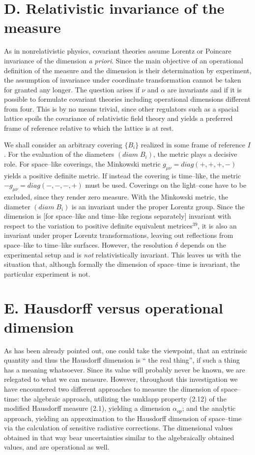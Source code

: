 \section{D. Relativistic invariance of the measure}
As in nonrelativistic physics, covariant theories
assume Lorentz or Poincare invariance of the dimension
{\it a priori}.
Since the main objective of an operational definition
of the measure and the dimension is their determination
by experiment, the assumption of invariance under
coordinate transformation cannot be taken for granted any
longer.
The question arises if $\nu $ and $\alpha $ are invariants
and if it is possible to formulate covariant theories including
operational dimensions different from four.
This is by no means trivial, since other regulators
such as a spacial lattice spoils the covariance of relativistic
field theory and yields a preferred frame of reference
relative to which the lattice is at rest.



We shall consider an arbitrary covering $\lbrace B_i\rbrace $
realized in some frame of reference $I$.
For the evaluation of the diameters $(diam\;B_i)$,
the metric plays a decisive role.
For space--like coverings, the Minkowski metric
$g_{\mu \nu }=diag(+,+,+,-)$ yields a positive definite
metric.
If instead the covering is time--like, the
metric $-g_{\mu \nu }=diag(-,-,-,+)$ must be used.
Coverings on the light--cone have to be excluded, since they
render zero measure.
With the Minkowski metric, the diameter $(diam\; B_i)$
is an invariant under the proper Lorentz group.
Since the dimension is [for space--like and time--like
regions separately] invariant with respect to
the variation to positive definite equivalent metrices$^{39}$,
it is also an invariant under proper Lorentz transformations,
leaving out reflections from space--like to time--like surfaces.
However, the  resolution $\delta $ depends on the experimental
setup and is {\it not} relativistically invariant.
This leaves us with the situation that, although formally
the dimension of space--time is invariant, the particular
experiment is not.
\endsection
\section{E. Hausdorff versus operational dimension}
As has been already pointed out, one could take the viewpoint, that an extrinsic
quantity and thus the Hausdorff dimension is ``
the real thing'', if such a thing has a meaning whatsoever.
Since its value will probably never be known, we are relegated
to what we can measure.
However, throughout this investigation we have
encountered two different approaches to measure
the dimension of space--time:
\itemize{1cm}
the algebraic approach, utilizing
the umklapp property (2.12) of the modified Hausdorff
measure (2.1),
yielding a dimension $\alpha_{op}$; and
the analytic approach, yielding an
approximation to the Hausdorff dimension of
space--time via the calculation of sensitive
radiative corrections.
The dimensional values obtained in that way
bear uncertainties similar to the algebraically obtained
values, and are operational as well.
\enditemize



